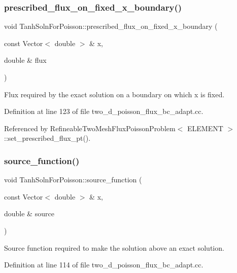 \subsubsection{\texorpdfstring{prescribed\+\_\+flux\+\_\+on\+\_\+fixed\+\_\+x\+\_\+boundary()}{prescribed\_flux\_on\_fixed\_x\_boundary()}}
{\footnotesize\ttfamily void Tanh\+Soln\+For\+Poisson\+::prescribed\+\_\+flux\+\_\+on\+\_\+fixed\+\_\+x\+\_\+boundary (\begin{DoxyParamCaption}\item[{const Vector$<$ double $>$ \&}]{x,  }\item[{double \&}]{flux }\end{DoxyParamCaption})}



Flux required by the exact solution on a boundary on which x is fixed. 



Definition at line 123 of file two\+\_\+d\+\_\+poisson\+\_\+flux\+\_\+bc\+\_\+adapt.\+cc.



Referenced by Refineable\+Two\+Mesh\+Flux\+Poisson\+Problem$<$ E\+L\+E\+M\+E\+N\+T $>$\+::set\+\_\+prescribed\+\_\+flux\+\_\+pt().

\mbox{\label{namespaceTanhSolnForPoisson_a967bc28320e02534beb714846b63e251}} 
\subsubsection{\texorpdfstring{source\+\_\+function()}{source\_function()}}
{\footnotesize\ttfamily void Tanh\+Soln\+For\+Poisson\+::source\+\_\+function (\begin{DoxyParamCaption}\item[{const Vector$<$ double $>$ \&}]{x,  }\item[{double \&}]{source }\end{DoxyParamCaption})}



Source function required to make the solution above an exact solution. 



Definition at line 114 of file two\+\_\+d\+\_\+poisson\+\_\+flux\+\_\+bc\+\_\+adapt.\+cc.



